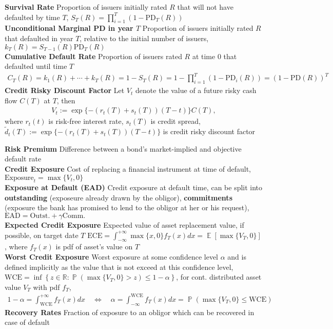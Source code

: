\documentclass[12pt,landscape, a4paper]{article}
\theoremstyle{remark}
\newcommand{\E}{\operatorname{\mathbb{E}}}
\newcommand{\prob}{\operatorname{\mathbb{P}}}
\newcommand{\PD}{\mathrm{PD}}
\begin{document}
\begin{multicols*}{3}
\textbf{Survival Rate} Proportion of issuers initially rated $R$ that will not have defaulted by time $T$, $S_T (R) = \prod^T_{i=1} (1-\PD_T (R))$\\

\textbf{Unconditional Marginal PD in year $T$} Proportion of issuers initially rated $R$ that defaulted in year $T$, relative to the initial number of issuers, $k_T (R) = S_{T-1} (R) \PD_T (R)$\\

\textbf{Cumulative Default Rate} Proportion of issuers rated $R$ at time $0$ that defaulted until time $T$
\begin{align*}
    C_T (R) = k_1 (R) + \cdots + k_T(R) = 1 - S_T (R) = 1 - \prod^T_{i=1} (1- \PD_i (R)) = (1 - \PD (R))^T
\end{align*}
\textbf{Credit Risky Discount Factor} Let $V_t$ denote the value of a future risky cash flow $C(T)$ at $T$, then
\begin{align*}
    V_t := \exp \{-(r_t (T) + s_t (T)) (T-t) \} C(T),
\end{align*}
where $r_t (t)$ is risk-free interest rate, $s_t (T)$ is credit spread, 
$\tilde{d}_t (T):= \exp \{-(r_t (T) + s_t (T)) (T-t) \}$ is credit risky discount factor

\textbf{Risk Premium} Difference between a bond's market-implied and objective default rate\\
\textbf{Credit Exposure} Cost of replacing a financial instrument at time of default, $\mathrm{Exposure}_t = \max \{V_t, 0 \}$\\
\textbf{Exposure at Default (EAD)} Credit exposure at default time, can be split into \textbf{outstanding} (exposeure already drawn by the obligor), \textbf{commitments} (exposure the bank has promised to lend to the obligor at  her or his request), $\mathrm{EAD} = \mathrm{Outst.} + \gamma \mathrm{Comm.}$
\\

\textbf{Expected Credit Exposure} Expected value of asset replacement value, if possible, on target date $T$
$\mathrm{ECE} = \int^{+\infty}_{-\infty} \max \{x, 0 \} f_T (x) dx = \E [\max \{V_T, 0 \}]$, where $f_T (x)$ is pdf of asset's value on $T$\\

\textbf{Worst Credit Exposure} Worst exposure at some confidence level $\alpha$ and is defined implicitly as the value that is not exceed at this confidence level, $\mathrm{WCE} = \inf \left\{z \in \mathbb{R}: \prob (\max \{V_T, 0 \} >z) \leq 1-\alpha \right\}$, for cont. distributed asset value $V_T$ with pdf $f_T$, 
\begin{align*}
    1 - \alpha = \int^{+\infty}_{\mathrm{WCE}} f_T (x) dx  \quad \Leftrightarrow \quad \alpha = \int^{\mathrm{WCE}}_{-\infty} f_T (x) dx = \prob \left(\max \{V_T, 0 \} \leq \mathrm{WCE} \right)
\end{align*}
\textbf{Recovery Rates} Fraction of exposure to an obligor which can be recovered in case of default\\


\end{multicols*}
\end{document}
